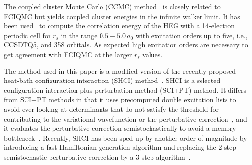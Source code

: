\documentclass[%
reprint,
 superscriptaddress,
 amsmath,amssymb,
 aps,
]{revtex4-1}
\begin{document}
The coupled cluster Monte Carlo (CCMC) method~\cite{Tho-PRL-10,neufeld2017study} is closely related
to FCIQMC but yields coupled cluster energies in the infinite walker limit.
It has been used~\cite{neufeld2017study} to compute the correlation energy of the HEG with a 14-electron periodic cell for
$r_s$ in the range $0.5 - 5.0\ a_0$ with excitation orders up to five, i.e., CCSDTQ5, and 358 orbitals.
As expected high excitation orders are necessary to get agreement with FCIQMC at the larger $r_s$ values.

%

The method used in this paper is a modified version of the recently proposed heat-bath configuration interaction (SHCI) method~\cite{HolTubUmr-JCTC-16,ShaHolJeaAlaUmr-JCTC-17,LiOttHolShaUmr-JCP-18}.
SHCI is a selected configuration interaction plus perturbation method (SCI+PT) method.
It differs from SCI+PT methods in that it uses precomputed double excitation lists to avoid ever looking
at determinants that do not satisfy the threshold for contributing to the variational wavefunction
or the perturbative correction~\cite{HolTubUmr-JCTC-16}, and it evaluates the perturbative
correction semistochastically to avoid a memory bottleneck~\cite{ShaHolJeaAlaUmr-JCTC-17}.
Recently, SHCI has been sped up by another order of magnitude by introducing a fast Hamiltonian generation algorithm and replacing the 2-step semistochastic perturbative correction by a 3-step algorithm~\cite{LiOttHolShaUmr-JCP-18}.
\end{document}
